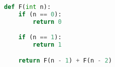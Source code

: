 \documentclass[preview]{standalone}
\begin{document}
\begin{center}
\begin{lstlisting}[language=Python]
def F(int n):
    if (n == 0):
        return 0

    if (n == 1):
        return 1

    return F(n - 1) + F(n - 2)
\end{lstlisting}
\end{center}
\end{document}
